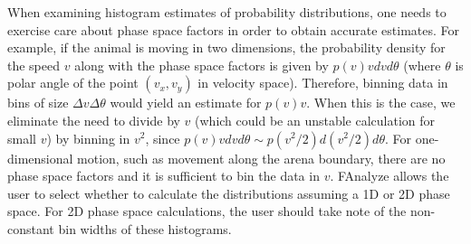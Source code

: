 \documentclass[letterpaper, 11pt]{article}
\begin{document}
 When examining histogram estimates of probability distributions, one needs to exercise care about phase space factors in order to obtain
accurate estimates.  For example, if the animal is moving in two dimensions, the probability
density for the speed $v$ along with the phase space factors is given by $p(v)vdvd\theta$ (where
$\theta$ is polar angle of the point $(v_x,v_y)$ in velocity space). Therefore, binning data in
bins of size $\Delta v\Delta\theta$ would yield an estimate for $p(v)v$. When this is the case, we
eliminate the need to divide by $v$ (which could be an unstable calculation for small $v$) by
binning in $v^2$, since $p(v)vdvd\theta \sim p(v^2/2)d(v^2/2)d\theta$. For one-dimensional motion,
such as movement along the arena boundary, there are no phase space factors and it is sufficient to
bin the data in $v$. FAnalyze allows the user to select whether to calculate the distributions
assuming a 1D or 2D phase space.   For 2D phase space calculations, the user should take note of
the non-constant bin widths of these histograms.
\end{document}
